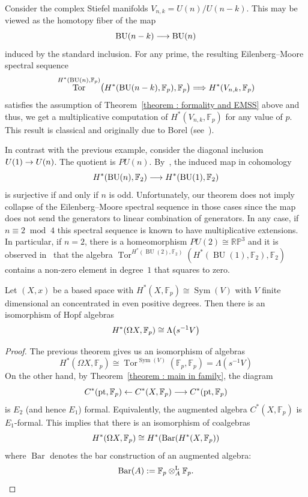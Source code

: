 \documentclass[AHL,Unicode,longabstracts,published]{cedram}
\DeclareMathOperator{\modd}{mod}
\DeclareMathOperator{\BU}{BU}
\DeclareMathOperator{\ppt}{pt}
\DeclareMathOperator{\sym}{Sym}
\DeclareMathOperator{\rTor}{Tor}
\DeclareMathOperator{\rBar}{Bar}
\renewcommand{\L}{\mathrm{L}}
\newcommand{\FF}{\mathbb{F}}
\newcommand{\bbRP}{\mathbb{RP}}
\renewcommand*{\to}{\mathchoice{\longrightarrow}{\rightarrow}{\rightarrow}{\rightarrow}}
\newcommand*{\RightArrow}{\mathchoice{\Longrightarrow}{\Rightarrow}{\Rightarrow}{\Rightarrow}}
\let\originalleft\left
\let\originalright\right
\renewcommand{\left}{\mathopen{}\mathclose\bgroup\originalleft}
\renewcommand{\right}{\aftergroup\egroup\originalright}
\newcommand{\FF}{\mathbb{F}}
\begin{document}
\begin{exam}
Consider the complex Stiefel manifolds $V_{n,k}=U(n)/U(n-k)$. This may be viewed as the homotopy fiber of the map
\[
\BU(n-k)\to \BU(n)
\]
induced by the standard inclusion. For any prime, the resulting Eilenberg--Moore spectral sequence
\[
\rTor^{H^*\left(\BU(n),\FF_p\right)}\bigl(H^*(\BU(n-k),\FF_p),\FF_p\bigr)\RightArrow H^*(V_{n,k},\FF_p)
\]
satisfies the assumption of Theorem~\ref{theorem : formality and EMSS} above and thus, we get a multiplicative computation of $H^*(V_{n,k},\FF_p)$ for any value of $p$. This result is classical and originally due to Borel (see~\cite[Section~9]{borel}).
\end{exam}

\begin{rema}
In contrast with the previous example, consider the diagonal inclusion $U(1)\to U(n)$. The quotient is $PU(n)$. By~\cite[Section~8, Example~4]{baumcohomology}, the induced map in cohomology
\[
H^*(\BU(n),\FF_2)\to H^*(\BU(1),\FF_2)
\]
is surjective if and only if $n$ is odd. Unfortunately, our theorem does not imply collapse of the Eilenberg--Moore spectral sequence in those cases since the map does not send the generators to linear combination of generators. In any case, if $n\equiv 2\;\modd\;4$ this spectral sequence is known to have multiplicative extensions. In particular, if $n=2$, there is a homeomorphism $PU(2)\cong \bbRP^3$ and it is observed in~\cite[Remark~12.9]{franzhomogeneous} that the algebra $\rTor^{H^*(\BU(2),\FF_2)}(H^*(\BU(1),\FF_2),\FF_2)$ contains a non-zero element in degree~$1$ that squares to zero.
\end{rema}

\begin{coro}
Let $(X,x)$ be a based space with $H^*(X,\FF_p)\cong \sym(V)$ with $V$ finite dimensional an concentrated in even positive degrees. Then there is an isomorphism of Hopf algebras
\[
H^*(\Omega X,\FF_p)\cong \Lambda\left(s^{-1}V\right)
\]
\end{coro}

\begin{proof}
The previous theorem gives us an isomorphism of algebras
\[
H^*(\Omega X,\FF_p)\cong \rTor^{\sym(V)}(\FF_p,\FF_p)=\Lambda(s^{-1}V)
\]
On the other hand, by Theorem~\ref{theorem : main in family}, the diagram
\[
C^*(\ppt,\FF_p)\leftarrow C^*(X,\FF_p)\to C^*(\ppt,\FF_p)
\]
is $E_2$ (and hence $E_1$) formal. Equivalently, the augmented algebra $C^*(X,\FF_p)$ is $E_1$-formal. This implies that there is an isomorphism of coalgebras
\[
H^*(\Omega X,\FF_p)\cong H^*\left(\rBar(H^*(X,\FF_p)\right)
\]
where $\rBar$ denotes the bar construction of an augmented algebra:
\[
\rBar(A):=\FF_p\otimes^{\L}_A\FF_p.\qedhere
\]
\end{proof}
\end{document}
